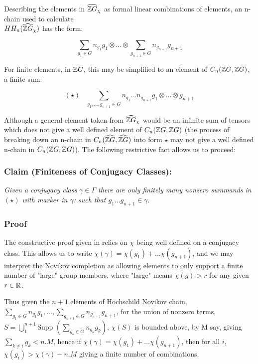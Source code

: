Describing the elements in $\widehat{\mathbb Z G}_\chi$ as formal linear combinations of elements, an n-chain used to calculate \\ $HH_n(\widehat{\mathbb Z G}_\chi)$ has the form:

$$\sum_{g_1\in G}n_{g_1} g_{1} \otimes\dots\otimes \sum_{g_{n+1}\in G}n_{g_{n+1}}g_{n+1}$$

For finite elements, in $\mathbb Z G$, this may be simplified to an element of $C_n({\mathbb Z G},{\mathbb Z G})$, a finite sum:

$$(\star)\,\,\,\,\, \sum_{g_1,\dots, g_{n+1}\in G} n_{g_1}\dots n_{g_{n+1}} g_1\otimes \dots \otimes g_{n+1}$$

Although a general element taken from $\widehat{\mathbb Z G}_\chi$ would be an infinite sum of tensors which does not give a well defined element of $C_n({\mathbb Z G},{\mathbb Z G})$ (the process of breaking down an n-chain in $C_n(\widehat{\mathbb Z G},\widehat{\mathbb Z G})$ into form $\star$ may not give a well defined n-chain in $C_n({\mathbb Z G},{\mathbb Z G})$). The following restrictive fact allows us to proceed:

\subsubsection{Claim (Finiteness of Conjugacy Classes):}
\emph{Given a conjugacy class $\gamma\in \Gamma$ there are only finitely many nonzero summands in $(\star)$ with marker in $\gamma$: such that $g_1\dots g_{n+1}\in \gamma$.}

\subsubsection*{Proof}
The constructive proof given in \cite{S} relies on $\chi$ being well defined on a conjugacy class. This allows us to write  $\chi(\gamma)=\chi(g_1)+\dots \chi(g_{n+1})$, and we may interpret the Novikov completion as allowing elements to only support a finite number of "large" group members, where "large" means $\chi(g)>r$ for any given $r\in \mathbb R$. 

Thus given the $n+1$ elements of Hochschild Novikov chain, $\sum_{g_1\in G}n_{g_1} g_{1},\dots, \sum_{g_{n+1}\in G}n_{g_{n+1}}g_{n+1}$, for the union of nonzero terms, $S=\bigcup_{1}^{n+1} \text{Supp }(\sum_{g_k\in G}n_{g_k} g_{k})$, $\chi ( S)$ is bounded above, by M say, giving $\sum_{k\neq i} g_{k} <n.M$, hence if $\chi(\gamma)=\chi(g_1)+\dots \chi(g_{n+1})$, then for all $i$, $\chi(g_i)> \chi(\gamma) - n.M$ giving a finite number of combinations.

